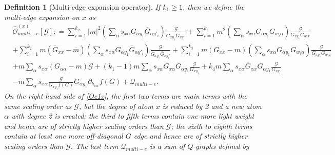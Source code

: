 \documentclass{article}
\newcommand{\1}{\mathds{1}}
\numberwithin{equation}{section}
\newcommand{\al}{\alpha}
\renewcommand{\cal}{\mathcal}
\newcommand{\wh}{\widehat}
\renewcommand{\geq}{\geqslant}
\renewcommand{\ge}{\geq}
\theoremstyle{plain} %
\newtheorem{definition}[theorem]{Definition}
\theoremstyle{remark}
\begin{document}
\begin{definition} [Multi-edge expansion operator]
\medskip
{} If $k_1\ge 1$, then we define the multi-edge expansion on $x$ as 
\begin{align} 
& \wh{\cal O}_{multi-e}^{(x)} \left[\cal G\right] : = \sum_{i=1}^{k_2}|m|^2  \left( \sum_\al s_{x\al }G_{\al y_1} \overline G_{\al y'_i}\right)\frac{\cal G}{G_{x y_1} \overline G_{xy_i'}}   + \sum_{i=1}^{k_3} m^2 \left(\sum_\al s_{x\al }G_{\al y_1} G_{w_i \al} \right)\frac{\cal G}{G_{xy_1}G_{w_i x}} \nonumber \\
& + \sum_{i=1}^{k_2}m  (\overline G_{xx} -\overline m) \left( \sum_\al s_{x\al }G_{\al y_1} \overline G_{\al y'_i}\right)\frac{\cal G}{G_{x y_1} \overline G_{xy_i'}}   + \sum_{i=1}^{k_3} m  (G_{xx}-m) \left(\sum_\al s_{x\al }G_{\al y_1} G_{w_i \al} \right)\frac{\cal G}{G_{xy_1}G_{w_i x}} \nonumber \\
& +  m   \sum_\al s_{x\al }\left(G_{\al \al}-m\right) \cal G  +(k_1-1) m  \sum_\al s_{x\al } G_{x \al} G_{\al y_1}\frac{ \cal G}{G_{xy_1}}  + k_4 m   \sum_\al s_{x\al }\overline G_{\al x} G_{\al y_1}  \frac{\cal G}{G_{xy_1}}  \nonumber\\
 & - m    \sum_\al s_{x\al } \frac{\cal G}{G_{x y_1}f(G)}G_{\al y_1}\partial_{ h_{\al x}}f (G)  +\cal Q_{multi-e} .\label{Oe1x}
\end{align}
On the right-hand side of \eqref{Oe1x}, the first two terms are main terms with the same scaling order as $\cal G$, but the degree of atom $x$ is reduced by 2 and a new atom $\al$ with degree 2 is created; the third to fifth terms contain one more light weight and hence are of  strictly higher scaling orders than $\cal G$; the sixth to eighth terms contain at least one more off-diagonal $G$ edge and hence are of strictly higher scaling orders than $\cal G$.  The last term $\cal Q_{multi-e} $ is a sum of $Q$-graphs defined by 

\end{definition}
\end{document}
